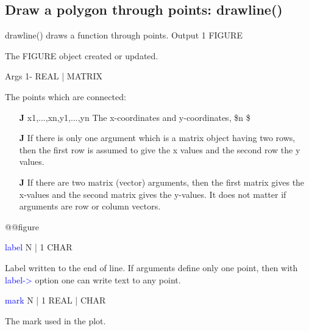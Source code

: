 \subsection{Draw a polygon through points: \textcolor{VioletRed}{drawline}()}
\label{drawline}
\textcolor{VioletRed}{drawline}() draws a function through points.
\vspace{0.3cm}
\hline
\vspace{0.3cm}
\noindent Output  \tabto{3cm}  1 \tabto{5cm}   FIGURE  \tabto{7cm}
\begin{changemargin}{3cm}{0cm}
\noindent  The FIGURE object created or updated.
\end{changemargin}
\vspace{0.3cm}
\hline
\vspace{0.3cm}
\noindent Args \tabto{3cm} 1-  \tabto{5cm}  REAL | MATRIX  \tabto{7cm}
\begin{changemargin}{3cm}{0cm}
\noindent  The points which are connected:
\begin{itemize}
\item[\textbf{J}\.] x1,...,xn,y1,...,yn The x-coordinates and y-coordinates,
\$n \$
\item[\textbf{J}\.]  If there is only one argument which is a
matrix object having two rows, then the first row is assumed to give the x values
and the second row the y values.
\item[\textbf{J}\.]  If there are two matrix (vector) arguments, then
the first matrix gives the x-values and the second matrix gives the y-values.
It does not matter if arguments are row or column vectors.
\end{itemize}
@@figure
\end{changemargin}
\vspace{0.3cm}
\hline
\vspace{0.3cm}
\noindent \textcolor{blue}{label}  \tabto{3cm}  N | 1  \tabto{5cm}   CHAR  \tabto{7cm}
\begin{changemargin}{3cm}{0cm}
\noindent  Label written to the end of line. If arguments define only one point,
then with \textcolor{blue}{label->} option one can write text to any point.
\end{changemargin}
\vspace{0.3cm}
\hline
\vspace{0.3cm}
\noindent \textcolor{blue}{mark}  \tabto{3cm}  N | 1  \tabto{5cm}   REAL | CHAR  \tabto{7cm}
\begin{changemargin}{3cm}{0cm}
\noindent  The mark used in the plot.
\end{changemargin}
